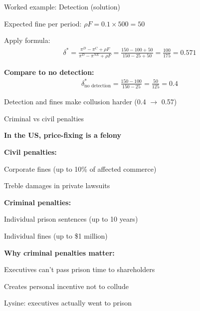 \documentclass[notes,11pt, aspectratio=169]{beamer}
\newenvironment{wideitemize}{\itemize\addtolength{\itemsep}{10pt}}{\enditemize}
\begin{document}
\begin{frame}{Worked example: Detection (solution)}
	\begin{wideitemize}
		\item Expected fine per period: $\rho F = 0.1 \times 500 = 50$
		\item Apply formula:
		\begin{align*}
			\delta^* = \frac{\pi^D - \pi^C + \rho F}{\pi^D - \pi^{NE} + \rho F} = \frac{150 - 100 + 50}{150 - 25 + 50} = \frac{100}{175} = 0.571
		\end{align*}
		\item \textbf{Compare to no detection:}
		\begin{align*}
			\delta^*_{\text{no detection}} = \frac{150 - 100}{150 - 25} = \frac{50}{125} = 0.4
		\end{align*}
		\item Detection and fines make collusion harder (0.4 $\rightarrow$ 0.57)
	\end{wideitemize}
\end{frame}

\begin{frame}{Criminal vs civil penalties}
	\begin{wideitemize}
		\item \textbf{In the US, price-fixing is a felony}
		\item \textbf{Civil penalties:}
		\begin{wideitemize}
			\vspace{5pt}
			\item Corporate fines (up to 10\% of affected commerce)
			\item Treble damages in private lawsuits
		\end{wideitemize}
		\item \textbf{Criminal penalties:}
		\begin{wideitemize}
			\vspace{5pt}
			\item Individual prison sentences (up to 10 years)
			\item Individual fines (up to \$1 million)
		\end{wideitemize}
		\item \textbf{Why criminal penalties matter:}
		\begin{wideitemize}
			\vspace{5pt}
			\item Executives can't pass prison time to shareholders
			\item Creates personal incentive not to collude
			\item Lysine: executives actually went to prison
		\end{wideitemize}
	\end{wideitemize}
\end{frame}
\end{document}

